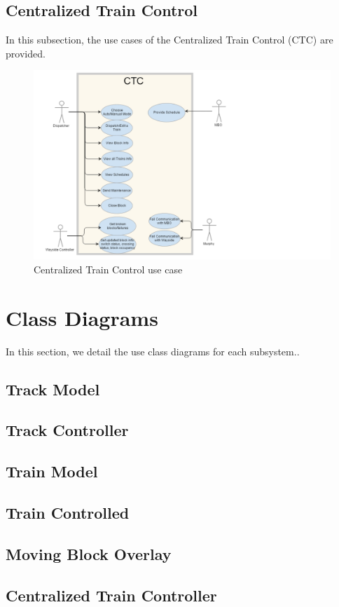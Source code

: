 \documentclass[]{article}
\begin{document}
\subsection{Centralized Train Control}
In this subsection, the use cases of the Centralized Train Control (CTC) are provided.
\begin{figure}[H]
	\centering
	\includegraphics[scale=.15]{ctcusecase.png}
	\caption{Centralized Train Control use case}
\end{figure}

\section{Class Diagrams}
In this section, we detail the use class diagrams for each subsystem..
\subsection{Track Model}
\subsection{Track Controller}
\subsection{Train Model}
\subsection{Train Controlled}
\subsection{Moving Block Overlay}
\subsection{Centralized Train Controller}
\end{document}

